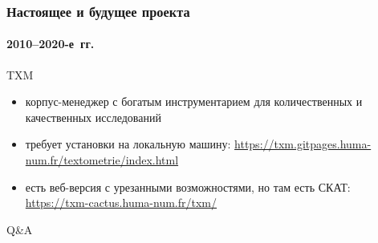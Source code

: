 \begin{frame}
  \frametitle{Настоящее и будущее проекта}
  \framesubtitle{2010--2020-е~гг.}

  \begin{block}{TXM}
    \begin{itemize}
      \item корпус-менеджер с богатым инструментарием для количественных и качественных исследований
      \item требует установки на локальную машину: \url{https://txm.gitpages.huma-num.fr/textometrie/index.html}
      \item есть веб-версия с урезанными возможностями, но там есть СКАТ: \url{https://txm-cactus.huma-num.fr/txm/}
    \end{itemize}
  \end{block}
\end{frame}

\begin{frame}{}
  \centering

  \vfill
  Q\&A
  \vfill
\end{frame}
